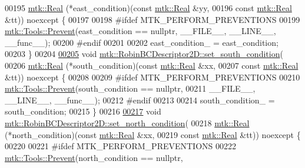 \begin{DoxyCode}
00195     \hyperlink{group__c01-roots_gac080bbbf5cbb5502c9f00405f894857d}{mtk::Real} (*east\_condition)(\textcolor{keyword}{const} \hyperlink{group__c01-roots_gac080bbbf5cbb5502c9f00405f894857d}{mtk::Real} &yy,
00196                                 \textcolor{keyword}{const} \hyperlink{group__c01-roots_gac080bbbf5cbb5502c9f00405f894857d}{mtk::Real} &tt)) noexcept \{
00197 
00198 \textcolor{preprocessor}{  #ifdef MTK\_PERFORM\_PREVENTIONS}
00199   \hyperlink{classmtk_1_1Tools_a332324c6f25e66be9dff48c5987a3b9f}{mtk::Tools::Prevent}(east\_condition == \textcolor{keyword}{nullptr}, \_\_FILE\_\_, \_\_LINE\_\_, \_\_func\_\_);
00200 \textcolor{preprocessor}{  #endif}
00201 
00202   east\_condition\_ = east\_condition;
00203 \}
00204 
\hypertarget{mtk__robin__bc__descriptor__2d_8cc_source_l00205}{}\hyperlink{classmtk_1_1RobinBCDescriptor2D_a3fbdf58ba24861011fd852f0c642a4c8}{00205} \textcolor{keywordtype}{void} \hyperlink{classmtk_1_1RobinBCDescriptor2D_a3fbdf58ba24861011fd852f0c642a4c8}{mtk::RobinBCDescriptor2D::set\_south\_condition}(
00206     \hyperlink{group__c01-roots_gac080bbbf5cbb5502c9f00405f894857d}{mtk::Real} (*south\_condition)(\textcolor{keyword}{const} \hyperlink{group__c01-roots_gac080bbbf5cbb5502c9f00405f894857d}{mtk::Real} &xx,
00207                                  \textcolor{keyword}{const} \hyperlink{group__c01-roots_gac080bbbf5cbb5502c9f00405f894857d}{mtk::Real} &tt)) noexcept \{
00208 
00209 \textcolor{preprocessor}{  #ifdef MTK\_PERFORM\_PREVENTIONS}
00210   \hyperlink{classmtk_1_1Tools_a332324c6f25e66be9dff48c5987a3b9f}{mtk::Tools::Prevent}(south\_condition == \textcolor{keyword}{nullptr},
00211                       \_\_FILE\_\_, \_\_LINE\_\_, \_\_func\_\_);
00212 \textcolor{preprocessor}{  #endif}
00213 
00214   south\_condition\_ = south\_condition;
00215 \}
00216 
\hypertarget{mtk__robin__bc__descriptor__2d_8cc_source_l00217}{}\hyperlink{classmtk_1_1RobinBCDescriptor2D_ade17884e6a2636a7c6f989602a0052e0}{00217} \textcolor{keywordtype}{void} \hyperlink{classmtk_1_1RobinBCDescriptor2D_ade17884e6a2636a7c6f989602a0052e0}{mtk::RobinBCDescriptor2D::set\_north\_condition}(
00218     \hyperlink{group__c01-roots_gac080bbbf5cbb5502c9f00405f894857d}{mtk::Real} (*north\_condition)(\textcolor{keyword}{const} \hyperlink{group__c01-roots_gac080bbbf5cbb5502c9f00405f894857d}{mtk::Real} &xx,
00219                                  \textcolor{keyword}{const} \hyperlink{group__c01-roots_gac080bbbf5cbb5502c9f00405f894857d}{mtk::Real} &tt)) noexcept \{
00220 
00221 \textcolor{preprocessor}{  #ifdef MTK\_PERFORM\_PREVENTIONS}
00222   \hyperlink{classmtk_1_1Tools_a332324c6f25e66be9dff48c5987a3b9f}{mtk::Tools::Prevent}(north\_condition == \textcolor{keyword}{nullptr},

\end{DoxyCode}
